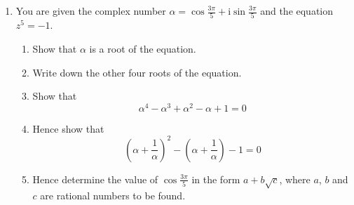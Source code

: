 \documentclass[leqno]{article}
\newcommand{\questionitem}{%
  \item\phantomsection
  \addcontentsline{toc}{section}{Question \number\value{enumi}}%
}
\begin{document}
\begin{enumerate}[
  label=\textbf{\arabic*.},
  leftmargin=*,
  topsep=0pt,
  partopsep=0pt,
  parsep=0pt
]
\begin{figure}[H]
\end{figure}


\begin{enumerate}[label=\textbf{(\alph*)}]
  \item Using the identity $zz^*=|z|^2$, or otherwise, show that if $w$ is any root of unity then
  \[
  |w-(1+\mathrm{i})|^2=3-(1-\mathrm{i})w-(1+\mathrm{i})w^*
  \]
\end{enumerate}
The diagram shows a regular decagon $A_1A_2\ldots A_{10}$ whose vertices all lie on the unit circle with centre at the origin $O$ and $A_1$ at $(1,0)$. The point $P$ lies in the same plane as the decagon and has coordinates $(1,1)$. \\

\begin{enumerate}[label=\textbf{(\alph*)}, resume]
  \item Using the result from part (a), find
\[
\sum_{r=1}^{5}(PA_{2r-1})^2
\]
\end{enumerate}

\newpage


\questionitem

You are given the complex number $\alpha=\cos \frac{3\pi}{5}+\mathrm{i}\sin \frac{3\pi}{5}$ and the equation $z^5=-1$. \\
\begin{enumerate}[label=\textbf{(\alph*)}]
  \item Show that $\alpha$ is a root of the equation.  \\
  \item Write down the other four roots of the equation.  \\
  \item Show that
  \[
  \alpha^4-\alpha^3+\alpha^2-\alpha+1=0
  \]
  \item Hence show that
  \[
  \left(\alpha+\frac{1}{\alpha}\right)^2-\left(\alpha+\frac{1}{\alpha}\right)-1=0
  \]
  \item Hence determine the value of $\cos \frac{3\pi}{5}$ in the form $a+b\sqrt{c}$, where $a$, $b$ and $c$ are rational numbers to be found.  \\
\end{enumerate}


\end{enumerate}
\end{document}
